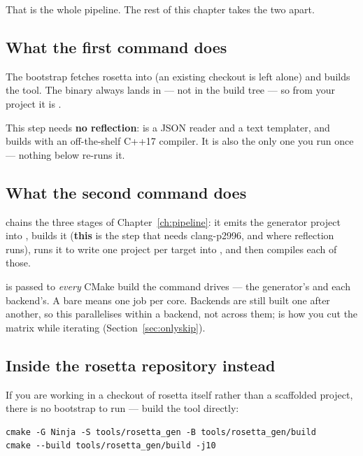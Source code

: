 That is the whole pipeline. The rest of this chapter takes the two apart.

\subsection*{What the first command does}

The bootstrap  fetches rosetta into  (an
existing checkout is left alone) and builds the  tool. The
binary always lands in  --- not in the build
tree --- so from your project it is .

This step needs \textbf{no reflection}:  is a JSON reader
and a text templater, and builds with an off-the-shelf C++17 compiler. It is
also the only one you run once --- nothing below re-runs it.

\subsection*{What the second command does}

 chains the three stages of Chapter~\ref{ch:pipeline}: it emits
the generator project into , builds it (\textbf{this} is the step
that needs clang-p2996, and where reflection runs), runs it to write one
project per target into , and then compiles each of those.

\begin{note}
 is passed to \emph{every} CMake build the command drives --- the
generator's and each backend's. A bare  means one job per core.
Backends are still built one after another, so this parallelises within a
backend, not across them;  is how you cut the matrix
while iterating (Section~\ref{sec:onlyskip}).
\end{note}

\subsection*{Inside the rosetta repository instead}

If you are working in a checkout of rosetta itself rather than a scaffolded
project, there is no bootstrap to run --- build the tool directly:

\begin{lstlisting}[style=sh]
cmake -G Ninja -S tools/rosetta_gen -B tools/rosetta_gen/build
cmake --build tools/rosetta_gen/build -j10
\end{lstlisting}

